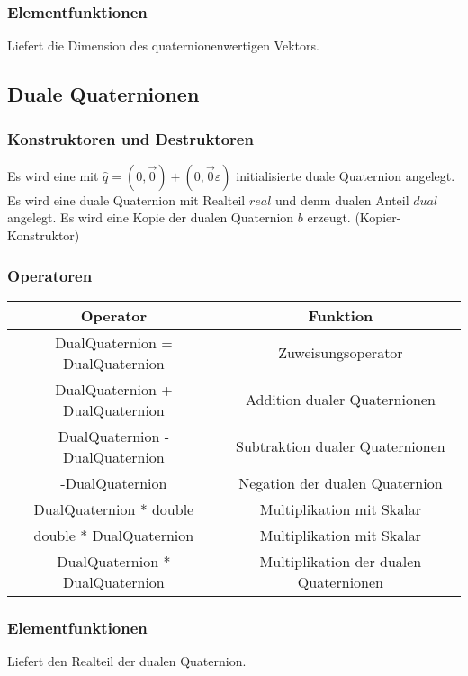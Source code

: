 	\subsubsection{Elementfunktionen}
		\descr
		{
			Liefert die Dimension des quaternionenwertigen Vektors.
		}
\subsection{Duale Quaternionen}
\subsubsection{Konstruktoren und Destruktoren}
	\descr
	{
		Es wird eine mit $\hat{q}=(0,\vec{0})+(0,\vec{0}\varepsilon)$ initialisierte duale
		Quaternion angelegt.
	}
	\descr
	{
		Es wird eine duale Quaternion mit Realteil $real$ und denm dualen Anteil	
		$dual$ angelegt.
	}
	\descr
	{
		Es wird eine Kopie der dualen Quaternion $b$ erzeugt. (Kopier-Konstruktor)
	}
	\subsubsection{Operatoren}
	\begin{tabular}{|c|c|}
			\hline
			Operator & Funktion\\ 
			\hline
			DualQuaternion = DualQuaternion & Zuweisungsoperator\\
			\hline
			DualQuaternion + DualQuaternion & Addition dualer Quaternionen\\
			\hline
			DualQuaternion - DualQuaternion & Subtraktion dualer Quaternionen\\
			\hline
			-DualQuaternion & Negation der dualen Quaternion\\
			\hline
			DualQuaternion * double & Multiplikation mit Skalar\\
			\hline
			double * DualQuaternion & Multiplikation mit Skalar\\
			\hline
			DualQuaternion * DualQuaternion & Multiplikation der dualen Quaternionen\\
			\hline
		\end{tabular}
		
		\subsubsection{Elementfunktionen}
		\descr
		{
			Liefert den Realteil der dualen Quaternion.
		}
		
